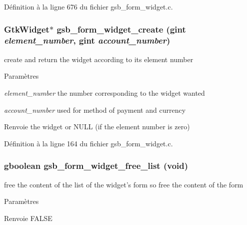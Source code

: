 Définition à la ligne 676 du fichier gsb\_\-form\_\-widget.c.

\subsubsection[{gsb\_\-form\_\-widget\_\-create}]{\setlength{\rightskip}{0pt plus 5cm}GtkWidget$\ast$ gsb\_\-form\_\-widget\_\-create (gint {\em element\_\-number}, \/  gint {\em account\_\-number})}\label{gsb__form__widget_8h_a12c6f45282e18968885785e41f434d50}
create and return the widget according to its element number


\begin{DoxyParams}{Paramètres}
\item[{\em element\_\-number}]the number corresponding to the widget wanted \item[{\em account\_\-number}]used for method of payment and currency\end{DoxyParams}
\begin{DoxyReturn}{Renvoie}
the widget or NULL (if the element number is zero) 
\end{DoxyReturn}


Définition à la ligne 164 du fichier gsb\_\-form\_\-widget.c.

\subsubsection[{gsb\_\-form\_\-widget\_\-free\_\-list}]{\setlength{\rightskip}{0pt plus 5cm}gboolean gsb\_\-form\_\-widget\_\-free\_\-list (void)}\label{gsb__form__widget_8h_acabcc2310e5c066c35065e2b8d2fdd73}
free the content of the list of the widget's form so free the content of the form


\begin{DoxyParams}{Paramètres}
\item[{\em }]\end{DoxyParams}
\begin{DoxyReturn}{Renvoie}
FALSE 
\end{DoxyReturn}



